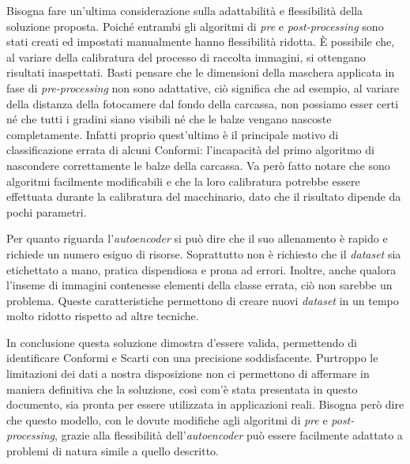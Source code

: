 Bisogna fare un'ultima considerazione sulla adattabilità e flessibilità della soluzione proposta.
Poiché entrambi gli algoritmi di \textit{pre} e \textit{post-processing} sono stati creati ed impostati manualmente hanno flessibilità ridotta.
È possibile che, al variare della calibratura del processo di raccolta immagini, si ottengano risultati inaspettati.
Basti pensare che le dimensioni della maschera applicata in fase di \textit{pre-processing} non sono adattative, ciò significa che ad esempio, al variare della distanza della fotocamere dal fondo della carcassa, non possiamo esser certi né che tutti i gradini siano visibili né che le balze vengano nascoste completamente.
Infatti proprio quest'ultimo è il principale motivo di classificazione errata di alcuni Conformi: l'incapacità del primo algoritmo di nascondere correttamente le balze della carcassa.
Va però fatto notare che sono algoritmi facilmente modificabili e che la loro calibratura potrebbe essere effettuata durante la calibratura del macchinario, dato che il risultato dipende da pochi parametri.

Per quanto riguarda l'\textit{autoencoder} si può dire che il suo allenamento è rapido e richiede un numero esiguo di risorse.
Soprattutto non è richiesto che il \textit{dataset} sia etichettato a mano, pratica dispendiosa e prona ad errori.
Inoltre, anche qualora l'inseme di immagini contenesse elementi della classe errata, ciò non sarebbe un problema.
Queste caratteristiche permettono di creare nuovi \textit{dataset} in un tempo molto ridotto rispetto ad altre tecniche.


In conclusione questa soluzione dimostra d'essere valida, permettendo di identificare Conformi e Scarti con una precisione soddisfacente.
Purtroppo le limitazioni dei dati a nostra disposizione non ci permettono di affermare in maniera definitiva che la soluzione, così com'è stata presentata in questo documento, sia pronta per essere utilizzata in applicazioni reali.
Bisogna però dire che questo modello, con le dovute modifiche agli algoritmi di \textit{pre} e \textit{post-processing}, grazie alla flessibilità dell'\textit{autoencoder} può essere facilmente adattato a problemi di natura simile a quello descritto.



